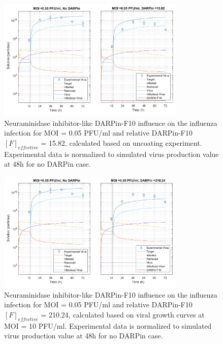 \begin{figure}
\begin{center}
\includegraphics[width=0.8\textwidth, trim={0cm 0cm 0cm 0cm}, clip]{D_chapters/3_DARPinModels/2_DARPinProduction/comparisonModelTHillIRVViDelayMOI0.072135DARPin15.816AsymmetricDarpinMyosinInhibitor.pdf}
\caption[Neuraminidase inhibitor-like DARPin-F10 for MOI = 0.05 PFU/ml and $F_{effective}$ = 15.82]{Neuraminidase inhibitor-like DARPin-F10 influence on the influenza infection for MOI = 0.05 PFU/ml and relative DARPin-F10 $[F]_{effective}$ = 15.82, calculated based on uncoating experiment. Experimental data is normalized to simulated virus production value at 48h for no DARPin case.}
\label{figure:neuraminidaseInhibitorLikeF15}
\end{center}
\end{figure}

\begin{figure}
\begin{center}
\includegraphics[width=0.8\textwidth, trim={0cm 0cm 0cm 0cm}, clip]{D_chapters/3_DARPinModels/2_DARPinProduction/comparisonModelTHillIRVViDelayMOI0.072135DARPin210.236AsymmetricDarpinMyosinInhibitor.pdf}
\caption[Neuraminidase inhibitor-like DARPin-F10 for MOI = 0.05 PFU/ml and $F_{effective}$ = 210.24]{Neuraminidase inhibitor-like DARPin-F10 influence on the influenza infection for MOI = 0.05 PFU/ml and relative DARPin-F10 $[F]_{effective}$ = 210.24, calculated based on viral growth curves at MOI = 10 PFU/ml. Experimental data is normalized to simulated virus production value at 48h for no DARPin case.}
\label{figure:neuraminidaseInhibitorLikeF210}
\end{center}
\end{figure}

